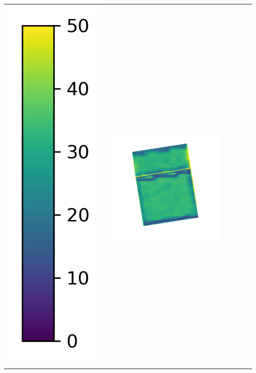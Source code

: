 \begin{tabularx}{\linewidth}{@{}Y@{}Y@{}Y@{}Y@{}Y@{}Y@{}}
\includegraphics[width=0.2\linewidth]{semisynthetic/colorbar_error_vertical.png} &
\includegraphics[width=\linewidth]{semisynthetic/20160617_0_ours_err.png} &

\end{tabularx}
